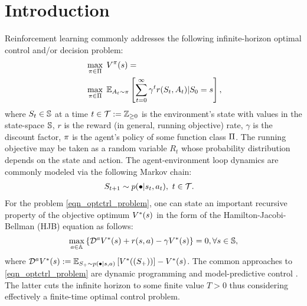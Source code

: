 \documentclass[12pt,twoside]{../../mitthesis}
\begin{document}
\section*{Introduction}
\label{sec:intro}
Reinforcement learning commonly addresses the following infinite-horizon optimal control and/or decision problem:
\begin{equation}
    \label{eqn_optctrl_problem}
    \begin{aligned}
    & \, \max_{\policy \in \policies} \; \Value^\policy (\state) = \\
    & \, \max_{\policy \in \policies} \; \E[\Action_t \sim \policy]{\sum\limits_{t=0}^{\infty} \gamma^t r(\State_t, \Action_t) \vert \State_0=\state},
    \end{aligned}
\end{equation}
where $\State_t \in \states$ at a time $t \in \T := \Z_{\ge0}$ is the environment's state with values in the state-space $\states$, $r$ is the reward (in general, running objective) rate, $\gamma$ is the discount factor, $\policy$ is the agent's policy of some function class $\policies$.
The running objective may be taken as a random variable $R_t$ whose probability distribution depends on the state and action.
The agent-environment loop dynamics are commonly modeled via the following Markov chain:
\begin{equation}
    \label{eqn_sysmarkov}
    \begin{aligned}
        & \State_{t+1} \sim \transit(\bullet \vert \state_t, \action_t), \spc t \in \T.
    \end{aligned}
\end{equation}
For the problem \eqref{eqn_optctrl_problem}, one can state an important recursive property of the objective optimum $\Value^*(\state)$ in the form of the Hamilton-Jacobi-Bellman (HJB) equation as follows:
\begin{equation}
    \label{eqn_hjb}
    \max_{\action \in \actions}{\{ \mathcal D^\action \Value^*(\state) + r(\state, \action) - \gamma \Value^*(\state)\}} = 0, \forall \state \in \states,
\end{equation}
where $\mathcal D^\action \Value^*(\state) := \E[S_+ \sim \transit(\bullet \vert \state, \action)]{\Value^*((\State_{+}))} - \Value^*(\state)$.
The common approaches to \eqref{eqn_optctrl_problem} are dynamic programming \cite{Bertsekas2019Reinforcementl,Lewis2009Reinforcementl} and model-predictive control \cite{Garcia1989Modelpredictiv,Borrelli2011PredictiveCont,Darby2012MPCCurrentpra,Mayne2014Modelpredictiv}.
The latter cuts the infinite horizon to some finite value $T>0$ thus considering effectively a finite-time optimal control problem.
\end{document}
